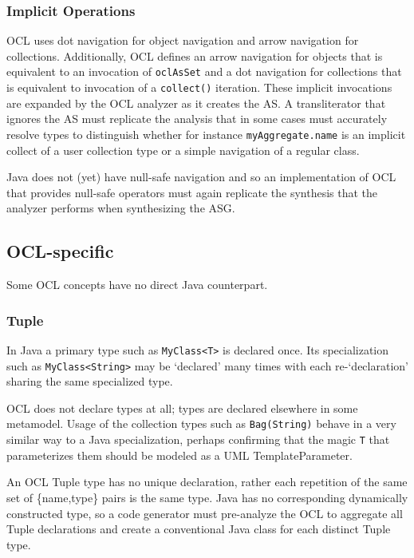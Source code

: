\documentclass[sigconf]{acmart}
\begin{document}
\subsubsection{Implicit Operations}

OCL uses dot navigation for object navigation and arrow navigation for collections. Additionally, OCL defines an arrow navigation for objects that is equivalent to an invocation of \verb|oclAsSet| and a dot navigation for collections that is equivalent to invocation of a \verb|collect()| iteration. These implicit invocations are expanded by the OCL analyzer as it creates the AS. A transliterator that ignores the AS must replicate the analysis that in some cases must accurately resolve types to distinguish whether for instance \verb|myAggregate.name| is an implicit collect of a user collection type or a simple navigation of a regular class.

Java does not (yet) have null-safe navigation and so an implementation of OCL that provides null-safe operators \cite{Willink2015} must again replicate the synthesis that the analyzer performs when synthesizing the ASG.  

\subsection{OCL-specific}

Some OCL concepts have no direct Java counterpart.

\subsubsection{Tuple}

In Java a primary type such as \verb|MyClass<T>| is declared once. Its specialization such as \verb|MyClass<String>| may be `declared' many times with each re-`declaration' sharing  the same specialized type.

OCL does not declare types at all; types are declared elsewhere in some metamodel. Usage of the collection types such as \verb|Bag(String)| behave in a very similar way to a Java specialization, perhaps confirming that the magic \verb|T| that parameterizes them should be modeled as a UML TemplateParameter.

An OCL Tuple type has no unique declaration, rather each repetition of the same  set of \{name,type\} pairs is the same type. Java has no corresponding dynamically constructed type, so a code generator must pre-analyze the OCL to aggregate all Tuple declarations and create a conventional Java class for each distinct Tuple type.
\end{document}
